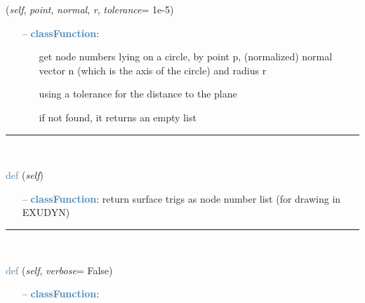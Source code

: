 \begin{itemize}[leftmargin=1.4cm]
\begin{itemize}[leftmargin=0.5cm]
\begin{itemize}[leftmargin=1.4cm]
\begin{itemize}[leftmargin=1.4cm]
\begin{itemize}[leftmargin=0.5cm]
\begin{flushleft}
({\it self}, {\it point}, {\it normal}, {\it r}, {\it tolerance}= 1e-5)
\end{flushleft}
\setlength{\itemindent}{0.7cm}
\begin{itemize}[leftmargin=0.7cm]
  \item[--]  \textcolor{steelblue}{\bf classFunction}: \vspace{-6pt}
  \begin{itemize}[leftmargin=1.2cm]
\setlength{\itemindent}{-0.7cm}
    \item[] get node numbers lying on a circle, by point p, (normalized) normal vector n (which is the axis of the circle) and radius r
    \item[] using a tolerance for the distance to the plane
    \item[] if not found, it returns an empty list
  \end{itemize}
\vspace{12pt}\end{itemize}
%
\noindent\rule{8cm}{0.75pt}\vspace{1pt} \\ 
\begin{flushleft}
\noindent \textcolor{steelblue}{def {\bf {}}}\label{sec:FEM:FEMinterface:GetSurfaceTriangles}
({\it self})
\end{flushleft}
\setlength{\itemindent}{0.7cm}
\begin{itemize}[leftmargin=0.7cm]
  \item[--]  \textcolor{steelblue}{\bf classFunction}: return surface trigs as node number list (for drawing in EXUDYN)\vspace{12pt}\end{itemize}
%
\noindent\rule{8cm}{0.75pt}\vspace{1pt} \\ 
\begin{flushleft}
\noindent \textcolor{steelblue}{def {\bf {}}}\label{sec:FEM:FEMinterface:VolumeToSurfaceElements}
({\it self}, {\it verbose}= False)
\end{flushleft}
\setlength{\itemindent}{0.7cm}
\begin{itemize}[leftmargin=0.7cm]
  \item[--]  \textcolor{steelblue}{\bf classFunction}: \vspace{-6pt}
  \begin{itemize}[leftmargin=1.2cm]

\end{itemize}
\end{itemize}
\end{itemize}
\end{itemize}
\end{itemize}
\end{itemize}
\end{itemize}
